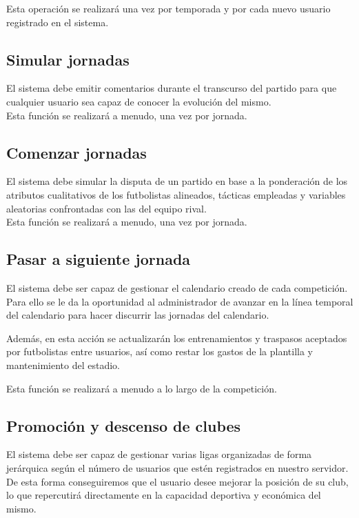 Esta operación se realizará una vez por temporada y por cada nuevo
usuario registrado en el sistema.

\subsection{Simular jornadas}
El sistema debe emitir comentarios durante el transcurso del partido para que
cualquier usuario sea capaz de conocer la evolución del mismo.\\

Esta función se realizará a menudo, una vez por jornada.

\subsection{Comenzar jornadas}
El sistema debe simular la disputa de un partido en base a la
ponderación de los atributos cualitativos de los futbolistas
alineados, tácticas empleadas y variables aleatorias confrontadas con las del equipo
rival.\\

Esta función se realizará a menudo, una vez por jornada.

\subsection{Pasar a siguiente jornada}
El sistema debe ser capaz de gestionar el calendario creado de cada
competición. Para ello se le da la oportunidad al administrador de
avanzar en la línea temporal del calendario para hacer discurrir las
jornadas del calendario.

Además, en esta acción se actualizarán los entrenamientos y traspasos
aceptados por futbolistas entre usuarios, así como restar los gastos
de la plantilla y mantenimiento del estadio.

Esta función se realizará a menudo a lo largo de la competición.

\subsection{Promoción y descenso de clubes}
El sistema debe ser capaz de gestionar varias ligas organizadas de
forma jerárquica según el número de usuarios que estén registrados en
nuestro servidor. De esta forma conseguiremos que el usuario desee
mejorar la posición de su club, lo que repercutirá directamente en la
capacidad deportiva y económica del mismo.\\

